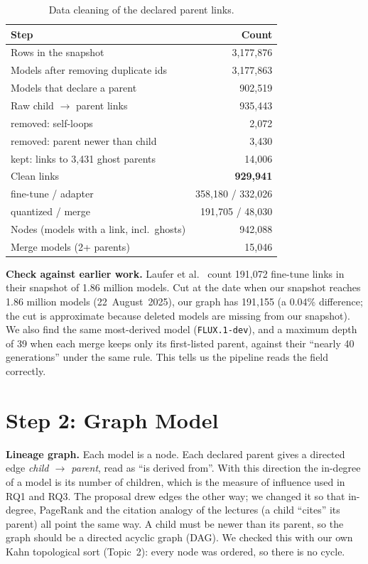 \documentclass[conference]{IEEEtran}
\newcommand{\model}[1]{\texttt{\small #1}}
\begin{document}
\begin{table}[t]
\caption{Data cleaning of the declared parent links.}
\label{tab:cleaning}
\centering
\small
\begin{tabular}{@{}lr@{}}
\toprule
Step & Count \\
\midrule
Rows in the snapshot & 3,177,876 \\
Models after removing duplicate ids & 3,177,863 \\
Models that declare a parent & 902,519 \\
Raw child $\to$ parent links & 935,443 \\
\quad removed: self-loops & 2,072 \\
\quad removed: parent newer than child & 3,430 \\
\quad kept: links to 3,431 ghost parents & 14,006 \\
Clean links & \textbf{929,941} \\
\quad fine-tune / adapter & 358,180 / 332,026 \\
\quad quantized / merge & 191,705 / 48,030 \\
Nodes (models with a link, incl.\ ghosts) & 942,088 \\
Merge models (2+ parents) & 15,046 \\
\bottomrule
\end{tabular}
\end{table}

\textbf{Check against earlier work.} Laufer et al.\ \cite{laufer2025} count
191,072 fine-tune links in their snapshot of 1.86 million models. Cut at the
date when our snapshot reaches 1.86 million models (22~August~2025), our graph
has 191,155 (a 0.04\% difference; the cut is approximate because deleted models
are missing from our snapshot). We also find the same most-derived model
(\model{FLUX.1-dev}), and a maximum depth of 39 when each merge keeps only its
first-listed parent, against their ``nearly 40 generations'' under the same
rule. This tells us the pipeline reads the field correctly.

\section{Step 2: Graph Model}

\textbf{Lineage graph.} Each model is a node. Each declared parent gives a
directed edge \emph{child $\to$ parent}, read as ``is derived from''. With this
direction the in-degree of a model is its number of children, which is the
measure of influence used in RQ1 and RQ3. The proposal drew edges the other
way; we changed it so that in-degree, PageRank and the citation analogy of the
lectures (a child ``cites'' its parent) all point the same way. A child must be
newer than its parent, so the graph should be a directed acyclic graph (DAG).
We checked this with our own Kahn topological sort (Topic~2): every node was
ordered, so there is no cycle.
\end{document}
